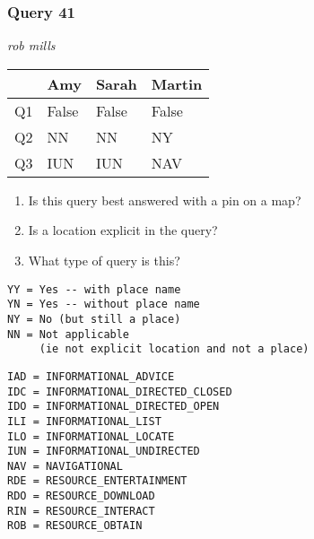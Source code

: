 \begin{frame}[fragile]
\frametitle{Query 41}
\vspace{1em}

\emph{rob mills}

\vfill

\begin{table}
  \centering
  \begin{tabular}{ l l l l }
    & \textbf{Amy} & \textbf{Sarah} & \textbf{Martin}\\
    \toprule
    Q1 & False & False & False\\
Q2 & NN & NN & NY\\
Q3 & IUN & IUN & NAV\\
    \bottomrule
  \end{tabular}
\end{table}

\vfill

\tiny{

\begin{enumerate}
\item Is this query best answered with a pin on a map?
\item Is a location explicit in the query?
\item What type of query is this?
\end{enumerate}

\vfill

\begin{multicols}{2}
\begin{verbatim}
YY = Yes -- with place name
YN = Yes -- without place name
NY = No (but still a place)
NN = Not applicable 
     (ie not explicit location and not a place)
\end{verbatim}

\columnbreak
\begin{verbatim}
IAD = INFORMATIONAL_ADVICE
IDC = INFORMATIONAL_DIRECTED_CLOSED
IDO = INFORMATIONAL_DIRECTED_OPEN
ILI = INFORMATIONAL_LIST
ILO = INFORMATIONAL_LOCATE
IUN = INFORMATIONAL_UNDIRECTED
NAV = NAVIGATIONAL
RDE = RESOURCE_ENTERTAINMENT
RDO = RESOURCE_DOWNLOAD
RIN = RESOURCE_INTERACT
ROB = RESOURCE_OBTAIN
\end{verbatim}
\end{multicols}
}

\end{frame}


